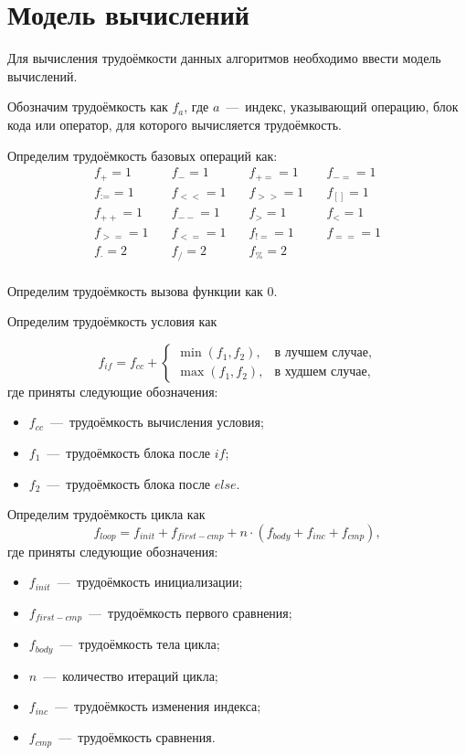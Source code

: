 \newpage

\section{Модель вычислений}
Для вычисления трудоёмкости данных алгоритмов необходимо ввести модель вычислений.

Обозначим трудоёмкость как $f_{a}$, где $a$~---~индекс, указывающий операцию, блок кода или оператор, для которого вычисляется трудоёмкость.

Определим трудоёмкость базовых операций как:
\begin{equation}
\begin{array}{rrrr}
	f_{+}=1 & \quad f_{-}=1 & \quad f_{+=}=1 & \quad f_{-=}=1 \\
	f_{:=}=1 & \quad f_{<<}=1 & \quad f_{>>}=1 & \quad f_{[]}=1 \\
	f_{++}=1 & \quad f_{--}=1 & \quad f_{>}=1 & \quad f_{<}=1 \\
	f_{>=}=1 & \quad f_{<=}=1 & \quad f_{!=}=1 & \quad f_{==}=1 \\
	f_{\cdot}=2 & \quad f_{/}=2 & \quad f_{\%}=2 & \quad \\
\end{array}
\end{equation}

Определим трудоёмкость вызова функции как $0$.

Определим трудоёмкость условия как

\begin{equation}
	f_{if} = f_{cc} + \begin{cases}
		\min(f_1, f_2),& \text{в лучшем случае}, \\
		\max(f_1, f_2),& \text{в худшем случае},
	\end{cases}
\end{equation}
где приняты следующие обозначения:
\begin{itemize}
	\item $f_{cc}$~---~трудоёмкость вычисления условия;
	\item $f_1$~---~трудоёмкость блока после $if$;
	\item $f_2$~---~трудоёмкость блока после $else$.
\end{itemize}

Определим трудоёмкость цикла как
\begin{equation}
	f_{loop} = f_{init} + f_{first-cmp} + n \cdot (f_{body} + f_{inc} + f_{cmp}),
\end{equation}
где приняты следующие обозначения:
\begin{itemize}
	\item $f_{init}$~---~трудоёмкость инициализации;
	\item $f_{first-cmp}$~---~трудоёмкость первого сравнения;
	\item $f_{body}$~---~трудоёмкость тела цикла;
	\item $n$~---~количество итераций цикла;
	\item $f_{inc}$~---~трудоёмкость изменения индекса;
	\item $f_{cmp}$~---~трудоёмкость сравнения.
\end{itemize}

